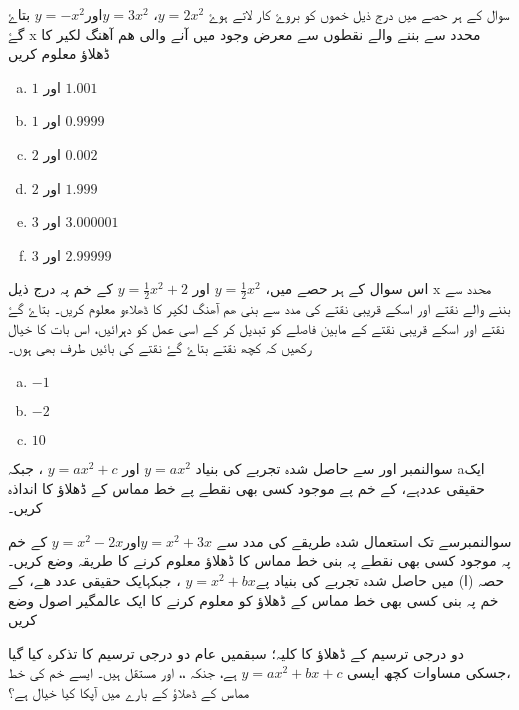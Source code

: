  سوال کے ہر حصے میں درج ذیل
  خموں کو بروۓ کار لاتے ہوۓ   \( y=2x^{2}\)، \( y=3x^{2}\)اور\( y=-x^{2}\)  بتاۓ گۓ x محدد سے بننے والے نقطوں سے معرض وجود میں آنے والی ھم آھنگ لکیر کا    ڈھلاؤ معلوم کریں 
\begin{multicols}{2}
\begin{enumerate}[a.]
\item \(1  \) اور \(1.001 \)
\item \( 1\) اور \(    0.9999  \)
\item \( 2 \) اور \(0.002  \)
\item \( 2 \) اور \( 1.999 \)
\item \( 3 \) اور \(  3.000001\)
\item \( 3 \) اور \( 2.99999 \)
\end{enumerate}
\end{multicols}
اس سوال کے ہر حصے میں، \( y=\frac{1}{2} x^{2}\) اور  \( y=\frac{1}{2} x^{2}+2\)   کے خم پہ درج ذیل                 x محدد سے بننے والے  نقتے اور اسکے قریبی نقتے کی مدد سے بنی    ھم آھنگ لکیر کا ڈھلاءو معلوم کریں۔ بتاۓ گۓ نقتے اور اسکے قریبی نقتے کے مابین فاصلے کو تبدیل کر کے اسی عمل کو دہرائیں، اس بات کا خیال رکھیں کہ کچھ نقتے بتاۓ گۓ نقتے کی بائیں طرف بھی ہوں۔
\begin{enumerate}[a.]
\item \(-1  \)
\item \( -2 \)
\item \( 10 \)
 \end{enumerate}
 

سوالنمبر   اور سے حاصل شدہ تجربے کی بنیاد \( y=ax^{2} \) اور    \( y=ax^{2} +c \) ، جبکہ aایک حقیقی عددہے،  کے خم پے موجود کسی بھی نقطے پے خط مماس کے ڈھلاؤ کا انداذہ کریں۔




سوالنمبرسے  تک استعمال شدہ طریقے کی مدد سے      \( y=x^{2} +3x\)اور\( y=x^{2} -2x\) کے خم پہ موجود کسی بھی نقطے پہ بنی خط مماس  کا ڈھلاؤ معلوم کرنے کا طریقہ وضع کریں۔
حصہ (ا) میں حاصل شدہ تجربے کی بنیاد پے\( y=x^{2} +bx\) ، جبکہایک حقیقی عدد ھے،   کے خم پہ بنی کسی بھی خط مماس کے ڈھلاؤ کو معلوم کرنے کا ایک عالمگیر اصول وضع کریں 

دو درجی ترسیم کے ڈھلاؤ کا کلیہ؛
سبقمیں عام دو درجی ترسیم کا تذکرہ کیا گیا ،جسکی مساوات کچھ ایسی  \(y=ax^{2}+bx +c\) ہے، جنکہ ،،          اور    مستقل ہیں۔ ایسے خم کی خط مماس کے ڈھلاؤ کے بارے میں آپکا کیا خیال ہے؟

